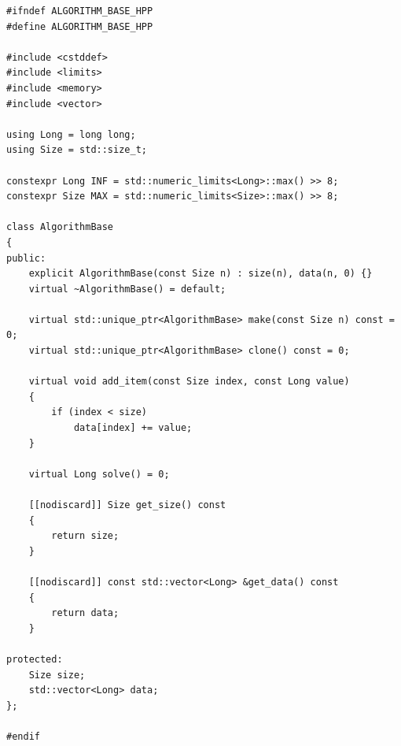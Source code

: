 \newpage

\label{ap:base}

\begin{lstlisting}[caption={Implementação em C++23 da interface base abstrata \lstinline{AlgorithmBase}.}, label={lst:base}]
#ifndef ALGORITHM_BASE_HPP
#define ALGORITHM_BASE_HPP

#include <cstddef>
#include <limits>
#include <memory>
#include <vector>

using Long = long long;
using Size = std::size_t;

constexpr Long INF = std::numeric_limits<Long>::max() >> 8;
constexpr Size MAX = std::numeric_limits<Size>::max() >> 8;

class AlgorithmBase
{
public:
	explicit AlgorithmBase(const Size n) : size(n), data(n, 0) {}
	virtual ~AlgorithmBase() = default;

	virtual std::unique_ptr<AlgorithmBase> make(const Size n) const = 0;
	virtual std::unique_ptr<AlgorithmBase> clone() const = 0;

	virtual void add_item(const Size index, const Long value)
	{
		if (index < size)
			data[index] += value;
	}

	virtual Long solve() = 0;

	[[nodiscard]] Size get_size() const
	{
		return size;
	}

	[[nodiscard]] const std::vector<Long> &get_data() const
	{
		return data;
	}

protected:
	Size size;
	std::vector<Long> data;
};

#endif
\end{lstlisting}
